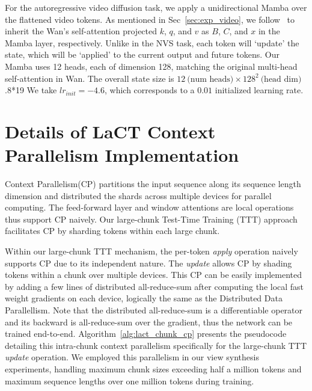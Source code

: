 For the autoregressive video diffusion task, we apply a unidirectional Mamba over the flattened video tokens. As mentioned in Sec~\ref{sec:exp_video}, we follow~\cite{wang2024mambainllama} to inherit the Wan's self-attention projected $k$, $q$, and $v$ as $B$, $C$, and $x$ in the Mamba layer, respectively. Unlike in the NVS task, each token will `update' the state, which will be `applied' to the current output and future tokens. Our Mamba uses 12 heads, each of dimension 128, matching the original multi-head self-attention in Wan. The overall state size is $12~\text{(num heads)} \times 128^{2} ~\text{(head dim)}$.8*19
We take $\mathit{lr}_\mathit{init}{=}-4.6$, which corresponds to a $0.01$ initialized learning rate.


\section{Details of LaCT Context Parallelism Implementation}

Context Parallelism(CP) partitions the input sequence along its sequence length dimension and distributed the shards across multiple devices for parallel computing. The feed-forward layer and window attentions are local operations thus support CP naively.  Our large-chunk Test-Time Training (TTT) approach facilitates CP by sharding tokens within each large chunk.

Within our large-chunk TTT mechanism, the per-token \textit{apply} operation naively supports CP due to its independent nature. The \textit{update} allows CP by shading tokens within a chunk over multiple devices. This CP can be easily implemented by adding a few lines of distributed all-reduce-sum after computing the local fast weight gradients on each device, logically the same as the Distributed Data Parallellism.  
Note that the distributed all-reduce-sum is a differentiable operator and its backward is all-reduce-sum over the gradient, thus the network can be trained end-to-end.
Algorithm~\ref{alg:lact_chunk_cp} presents the pseudocode detailing this intra-chunk context parallelism specifically for the large-chunk TTT \textit{update} operation. We employed this parallelism in our view synthesis experiments, handling maximum chunk sizes exceeding half a million tokens and maximum sequence lengths over one million tokens during training.


